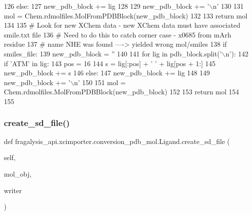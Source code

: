 \begin{DoxyCode}
126                     \textcolor{keywordflow}{else}:
127                         new\_pdb\_block += lig
128 
129                     new\_pdb\_block += \textcolor{stringliteral}{'\(\backslash\)n'}
130 
131                 mol = Chem.rdmolfiles.MolFromPDBBlock(new\_pdb\_block)
132 
133                 \textcolor{keywordflow}{return} mol
134 
135         \textcolor{comment}{# Look for new XChem data - new XChem data must have associated smile.txt file}
136         \textcolor{comment}{# Need to do this to catch corner case - x0685 from mArh residue}
137         \textcolor{comment}{# name NHE was found ----> yielded wrong mol/smiles}
138         \textcolor{keywordflow}{if} smiles\_file:
139             new\_pdb\_block = \textcolor{stringliteral}{''}
140 
141             \textcolor{keywordflow}{for} lig \textcolor{keywordflow}{in} pdb\_block.split(\textcolor{stringliteral}{'\(\backslash\)n'}):
142                 \textcolor{keywordflow}{if} \textcolor{stringliteral}{'ATM'} \textcolor{keywordflow}{in} lig:
143                     pos = 16
144                     s = lig[:pos] + \textcolor{stringliteral}{' '} + lig[pos + 1:]
145                     new\_pdb\_block += s
146                 \textcolor{keywordflow}{else}:
147                     new\_pdb\_block += lig
148 
149                 new\_pdb\_block += \textcolor{stringliteral}{'\(\backslash\)n'}
150 
151             mol = Chem.rdmolfiles.MolFromPDBBlock(new\_pdb\_block)
152 
153             \textcolor{keywordflow}{return} mol
154 
155 
\end{DoxyCode}
\mbox{\label{classfragalysis__api_1_1xcimporter_1_1conversion__pdb__mol_1_1_ligand_a9985de5dae739f11768aa6985ccd94bd}} 
\subsubsection{\texorpdfstring{create\+\_\+sd\+\_\+file()}{create\_sd\_file()}}
{\footnotesize\ttfamily def fragalysis\+\_\+api.\+xcimporter.\+conversion\+\_\+pdb\+\_\+mol.\+Ligand.\+create\+\_\+sd\+\_\+file (\begin{DoxyParamCaption}\item[{}]{self,  }\item[{}]{mol\+\_\+obj,  }\item[{}]{writer }\end{DoxyParamCaption})}



